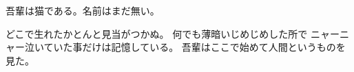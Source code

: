 \documentclass{jsarticle}
\begin{document}
吾輩は猫である。名前はまだ無い。

どこで生れたかとんと見当がつかぬ。
何でも薄暗いじめじめした所で
ニャーニャー泣いていた事だけは記憶している。
吾輩はここで始めて人間というものを見た。
\end{document}
